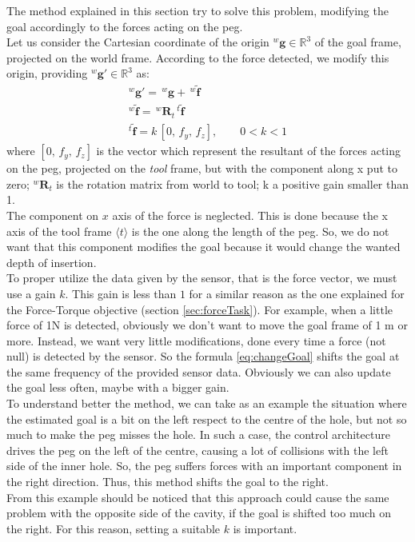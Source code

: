 The method explained in this section try to solve this problem, modifying the goal accordingly to the forces acting on the peg.\\
Let us consider the Cartesian coordinate of the origin $^{w}\boldsymbol{g} \in \mathbb{R}^{3}$ of the goal frame, projected on the world frame. According to the force detected, we modify this origin, providing $^{w}\boldsymbol{g'} \in \mathbb{R}^{3}$ as:
\begin{equation}
	\label{eq:changeGoal}
	\begin{gathered}
	^{w}\boldsymbol{g'} = \,^{w}\boldsymbol{g} + \, ^{w}\boldsymbol{\tilde{f}} \\
	 ^{w}\boldsymbol{\tilde{f}} =  \,^{w}\boldsymbol{R}_t \,^{t}\boldsymbol{\tilde{f}} \\
	 ^{t}\boldsymbol{\tilde{f}} = k \, [ 0, \, f_y, \, f_z ], \qquad 0 < k < 1
%
	 \end{gathered}
\end{equation}
where $[ 0, \, f_y, \, f_z ]$ is the vector which represent the resultant of the forces acting on the peg, projected on the \textit{tool} frame, but with the component along x put to zero; $^{w}\boldsymbol{R}_t$ is the rotation matrix from world to tool; k a positive gain smaller than 1.\\
The component on $x$ axis of the force is neglected. This is done because the x axis of the tool frame $ \langle t \rangle $ is the one along the length of the peg. So, we do not want that this component modifies the goal because it would change the wanted depth of insertion.\\

To proper utilize the data given by the sensor, that is the force vector, we must use a gain $k$. This gain is less than $1$ for a similar reason as the one explained for the Force-Torque objective (section \ref{sec:forceTask}). For example, when a little force of 1N is detected, obviously we don't want to move the goal frame of 1 m or more. Instead, we want very little modifications, done every time a force (not null) is detected by the sensor. So the formula \eqref{eq:changeGoal} shifts the goal at the same frequency of the provided sensor data. Obviously we can also update the goal less often, maybe with a bigger gain.\\ 

To understand better the method, we can take as an example the situation where the estimated goal is a bit on the left respect to the centre of the hole, but not so much to make the peg misses the hole. In such a case, the control architecture drives the peg on the left of the centre, causing a lot of collisions with the left side of the inner hole. So, the peg suffers forces with an important component in the right direction. Thus, this method shifts the goal to the right.\\
From this example should be noticed that this approach could cause the same problem with the opposite side of the cavity, if the goal is shifted too much on the right. For this reason, setting a suitable $k$ is important.


